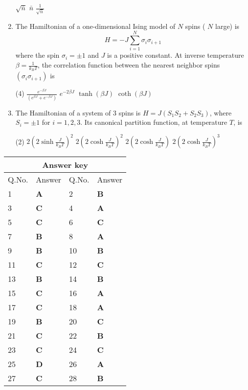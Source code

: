 \begin{enumerate}
\begin{tasks}
\task[\textbf{B.}]  $\sqrt{\bar{n}}$
\task[\textbf{C.}] $\bar{n}$
\task[\textbf{D.}] $\frac{1}{\sqrt{\bar{n}}}$
\end{tasks}
 \item The Hamiltonian of a one-dimensional Ising model of $N$ spins ( $N$ large) is
 $$
 H=-J \sum_{i=1}^{N} \sigma_{i} \sigma_{i+1}
 $$
 where the spin $\sigma_{i}=\pm 1$ and $J$ is a positive constant. At inverse temperature $\beta=\frac{1}{k_{B} T}$, the correlation function between the nearest neighbor spins $\left(\sigma_{i} \sigma_{i+1}\right)$ is
{}
\begin{tasks}(4)
\task[\textbf{A.}] $\frac{e^{-\beta J}}{\left(e^{\beta J}+e^{-\beta J}\right)}$
\task[\textbf{B.}] $e^{-2 \beta J}$
\task[\textbf{C.}] $\tanh (\beta J)$
\task[\textbf{D.}] $\operatorname{coth}(\beta J)$
\end{tasks}
 \item  The Hamiltonian of a system of 3 spins is $H=J\left(S_{1} S_{2}+S_{2} S_{3}\right)$, where $S_{i}=\pm 1$ for $i=1,2,3$. Its canonical partition function, at temperature $T$, is
{ }
\begin{tasks}(2)
\task[\textbf{A.}] $2\left(2 \sinh \frac{J}{k_{B} T}\right)^{2}$
\task[\textbf{B.}]  $2\left(2 \cosh \frac{J}{k_{B} T}\right)^{2}$
\task[\textbf{C.}]  $2\left(2 \cosh \frac{J}{k_{B} T}\right)$
\task[\textbf{D.}] $2\left(2 \cosh \frac{J}{k_{B} T}\right)^{3}$
\end{tasks}
\end{enumerate}
\setlength\arrayrulewidth{1pt}
\begin{table}[H]
	\centering
	\begin{tabular}{|p{1.5cm}|p{1.5cm}||p{1.5cm}|p{1.5cm}|}
		\hline
		\multicolumn{4}{|c|}{\textbf{Answer key}}\\\hline\hline
		\rowcolor{ocrel}Q.No.&Answer&Q.No.&Answer\\\hline
		1&\textbf{A} &2&\textbf{B}\\\hline
		3&\textbf{C} &4&\textbf{A} \\\hline
		5&\textbf{C} &6&\textbf{C} \\\hline
		7&\textbf{B}&8&\textbf{A}\\\hline
		9&\textbf{B}&10&\textbf{B}\\\hline
		11&\textbf{C} &12&\textbf{C}\\\hline
		13&\textbf{B}&14&\textbf{B}\\\hline
		15&\textbf{C}&16 &\textbf{A}\\\hline
		17&\textbf{C}&18 &\textbf{A}\\\hline
		19&\textbf{B}&20&\textbf{C}\\\hline
		21&\textbf{C} &22&\textbf{B}\\\hline
		23&\textbf{C}&24&\textbf{C}\\\hline
		25&\textbf{D}&26 &\textbf{A}\\\hline
		27&\textbf{C}&28 &\textbf{B}\\\hline
	\end{tabular}
\end{table}
